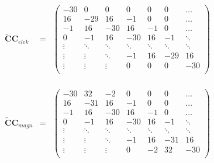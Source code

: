 \documentclass[Protokollheft.tex]{subfiles}
\begin{document}
\begin{eqnarray*}
\mathbf{\widetilde{C}C}_{elek}&=&\begin{pmatrix} -30 & 0 & 0 & 0 & 0 & 0 & \dots \\ 
16 & -29 & 16 & -1 & 0 & 0 & \dots\\ 
-1 & 16 & -30 & 16 & -1 & 0 & \dots\\ 
0 & -1 & 16 & -30 & 16 & -1 & \ddots\\ 
\vdots & \ddots & \ddots & \ddots & \ddots & \ddots & \ddots\\
\vdots & \vdots & \ddots & -1 & 16 & -29 & 16\\
\vdots & \vdots & \vdots & 0 & 0 & 0 & -30\\
\end{pmatrix}
\\
\\
\\
\\
\mathbf{\widetilde{C}C}_{magn}&=&\begin{pmatrix} -30 & 32 & -2 & 0 & 0 & 0 & \dots \\ 
	16 & -31 & 16 & -1 & 0 & 0 & \dots\\ 
	-1 & 16 & -30 & 16 & -1 & 0 & \dots\\ 
	0 & -1 & 16 & -30 & 16 & -1 & \ddots\\ 
	\vdots & \ddots & \ddots & \ddots & \ddots & \ddots & \ddots\\
	\vdots & \vdots & \ddots & -1 & 16 & -31 & 16\\
	\vdots & \vdots & \vdots & 0 & -2 & 32 & -30\\
\end{pmatrix}
\end{eqnarray*}
\end{document}

